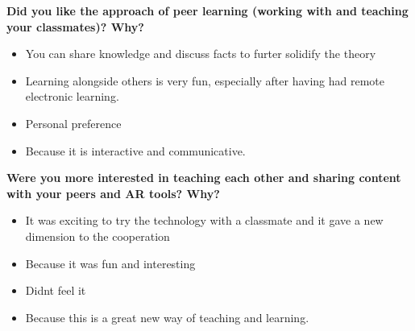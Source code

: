 {\small
\noindent
\textbf{Did you like the approach of peer learning (working with and teaching your classmates)? Why?}
\begin{itemize}[]
    \itshape\footnotesize


\item You can share knowledge and discuss facts to furter solidify the theory
\item Learning alongside others is very fun, especially after having had remote electronic learning.
    \item Personal preference
    \item Because it is interactive and communicative.


\end{itemize}
}

{\small
\noindent
\textbf{Were you more interested in teaching each other and sharing content with your peers and AR tools? Why?}
\begin{itemize}[]
    \itshape\footnotesize
    \item It was exciting to try the technology with a classmate and it gave a new dimension to the cooperation
    \item Because it was fun and interesting
    \item Didnt feel it
    \item Because this is a great new way of teaching and learning.


\end{itemize}
}
